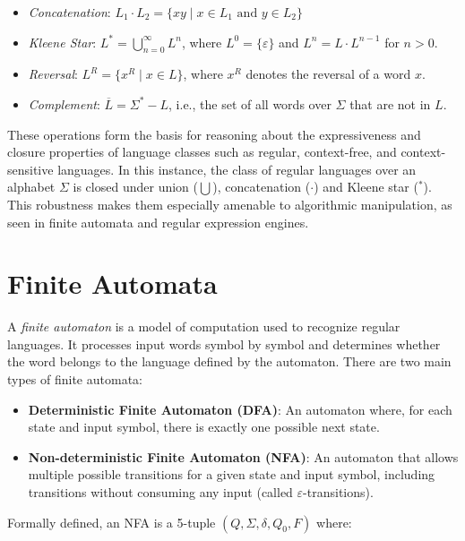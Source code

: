 \begin{itemize}
	\item \emph{Concatenation}: $L_1 \cdot L_2 = \{ xy \mid x \in L_1 \text{ and } y \in L_2 \}$
	\item \emph{Kleene Star}: $L^* = \bigcup_{n=0}^{\infty} L^n$, where $L^0 = \{\varepsilon\}$ and $L^n = L \cdot L^{n-1}$ for $n > 0$.
	\item \emph{Reversal}: $L^R = \{ x^R \mid x \in L \}$, where $x^R$ denotes the reversal of a word $x$.
	\item \emph{Complement}: $\overline{L} = \Sigma^* - L$, i.e., the set of all words over $\Sigma$ that are not in $L$.
\end{itemize}

These operations form the basis for reasoning about the expressiveness and closure properties of language classes such as regular, context-free, and context-sensitive languages.
In this instance, the class of regular languages over an alphabet $\Sigma$ is closed under union ($\bigcup$), concatenation ($\cdot$) and Kleene star ($^*$).
This robustness makes them especially amenable to algorithmic manipulation, as seen in finite automata and regular expression engines.

\section{Finite Automata}
A \emph{finite automaton} is a model of computation used to recognize regular languages. It processes input words symbol by symbol and determines whether the word belongs to the language defined by the automaton. There are two main types of finite automata:

\begin{itemize}
    \item \textbf{Deterministic Finite Automaton (DFA)}: An automaton where, for each state and input symbol, there is exactly one possible next state.
    \item \textbf{Non-deterministic Finite Automaton (NFA)}: An automaton that allows multiple possible transitions for a given state and input symbol, including transitions without consuming any input (called $\varepsilon$-transitions).
\end{itemize}

Formally defined, an NFA is a 5-tuple $(Q, \Sigma, \delta, Q_0, F)$ where:

